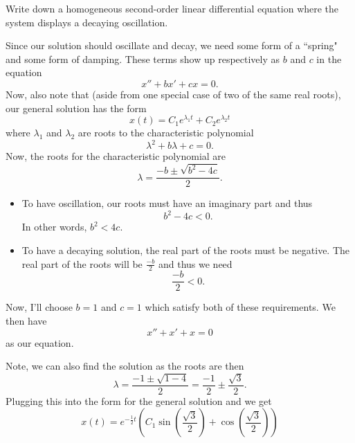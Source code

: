 \documentclass[12pt]{article} %
\begin{document}
\newpage
\begin{problem}
Write down a homogeneous second-order linear differential equation where the system displays a decaying oscillation.
\end{problem}
\begin{solution}
Since our solution should oscillate and decay, we need some form of a ``spring" and some form of damping.  These terms show up respectively as $b$ and $c$ in the equation
\[
x''+bx'+cx=0.
\]
Now, also note that (aside from one special case of two of the same real roots), our general solution has the form
\[
x(t)=C_1 e^{\lambda_1 t}+C_2e^{\lambda_2 t}
\]
where $\lambda_1$ and $\lambda_2$ are roots to the characteristic polynomial
\[
\lambda^2+b\lambda + c =0.
\]
Now, the roots for the characteristic polynomial are
\[
\lambda = \frac{-b \pm \sqrt{b^2-4c}}{2}.
\]
\begin{itemize}
    \item To have oscillation, our roots must have an imaginary part and thus 
    \[
    b^2-4c<0.
    \]
    In other words, $b^2<4c.$
    \item To have a decaying solution, the real part of the roots must be negative. The real part of the roots will be $\frac{-b}{2}$ and thus we need
    \[
    \frac{-b}{2}<0.
    \]
\end{itemize}
Now, I'll choose $b=1$ and $c=1$ which satisfy both of these requirements. We then have
\[
x''+x'+x=0
\]
as our equation.

Note, we can also find the solution as the roots are then
\[
\lambda = \frac{-1\pm \sqrt{1-4}}{2}=\frac{-1}{2}\pm \frac{\sqrt{3}}{2}.
\]
Plugging this into the form for the general solution and we get
\[
x(t)=e^{-\frac{1}{2}t}\left(C_1 \sin\left(\frac{\sqrt{3}}{2}\right) + \cos\left(\frac{\sqrt{3}}{2}\right)\right)
\]
\end{solution}
\end{document}
